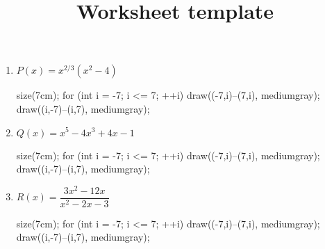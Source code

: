 \documentclass[12pt]{article}
\title{Worksheet template}
\begin{document}
\bigskip
\bigskip


\bigskip

\begin{enumerate}

	\item $P(x) = x^{2/3} \left( x^2 - 4 \right)$
	\begin{flushright}
	\begin{asy}
	size(7cm);
	for (int i = -7; i <= 7; ++i)
	{
    	draw((-7,i)--(7,i), mediumgray);
	    draw((i,-7)--(i,7), mediumgray);
    }
	\end{asy}
	\end{flushright}

    \item $Q(x) = x^5 - 4x^3 + 4x - 1$
    
	\begin{flushright}
	\begin{asy}
	size(7cm);
	for (int i = -7; i <= 7; ++i)
	{
    	draw((-7,i)--(7,i), mediumgray);
	    draw((i,-7)--(i,7), mediumgray);
    }
	\end{asy}
	\end{flushright}

\newpage

	\item $R(x) = \dfrac{3x^2 - 12x}{x^2 - 2x - 3}$
    
	\begin{flushright}
	\begin{asy}
	size(7cm);
	for (int i = -7; i <= 7; ++i)
	{
    	draw((-7,i)--(7,i), mediumgray);
	    draw((i,-7)--(i,7), mediumgray);
    }
	\end{asy}
	\end{flushright}

\end{enumerate}
\end{document}
